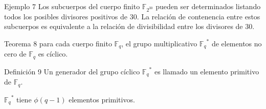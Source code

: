 \documentclass[presentation]{beamer}
\newcommand{\F}{\mathds{F}}
\begin{document}
\begin{frame}
  \begin{block}{Ejemplo 7}
    Los subcuerpos del cuerpo finito $\F_{2^30}$ pueden ser determinados listando todos los posibles divisores positivos de $30$. La relación de contenencia entre estos subcuerpos es equivalente a la relación de divisibilidad entre los divisores de $30$.

    \begin{figure}[H]
      \centering
    \end{figure}
  \end{block}
\end{frame}

\begin{frame}
  \begin{block}{Teorema 8}
    para cada cuerpo finito $\F_q$, el grupo multiplicativo $ {\F_{q}}^* $ de elementos no cero de $\F_q$ es cíclico.
  \end{block}
  \pause
  \begin{block}{Definición 9}
    Un generador del grupo cíclico ${\F_q}^*$ es llamado un elemento primitivo de $\F_q$.
  \end{block}
  \pause
  $ {\F_q}^* $ tiene $\phi(q-1)$ elementos primitivos.
\end{frame}
\end{document}
